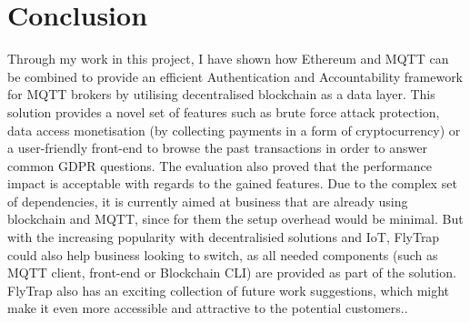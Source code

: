 \section{Conclusion}
Through my work in this project, I have shown how Ethereum and MQTT can be combined to provide an efficient Authentication and Accountability framework for MQTT brokers by utilising decentralised blockchain as a data layer. This solution provides a novel set of features such as brute force attack protection, data access monetisation (by collecting payments in a form of cryptocurrency) or a user-friendly front-end to browse the past transactions in order to answer common GDPR questions. The evaluation also proved that the performance impact is acceptable with regards to the gained features. Due to the complex set of dependencies, it is currently aimed at business that are already using blockchain and MQTT, since for them the setup overhead would be minimal. But with the increasing popularity with decentralisied solutions and IoT, FlyTrap could also help business looking to switch, as all needed components (such as MQTT client, front-end or Blockchain CLI) are provided as part of the solution. FlyTrap also has an exciting collection of future work suggestions, which might make it even more accessible and attractive to the potential customers..
